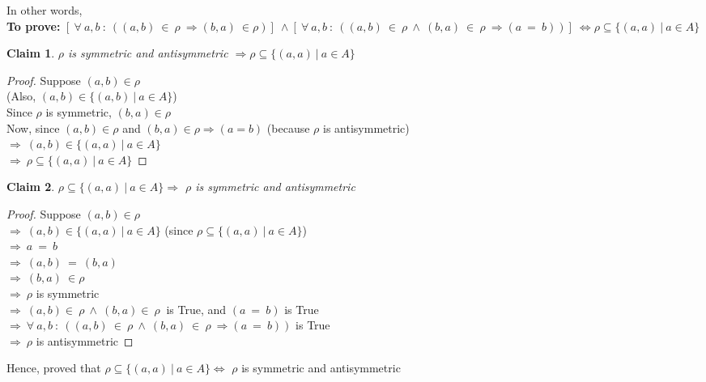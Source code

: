 \documentclass[a4paper]{article}
\newcounter{solution}
\newtheorem{claim}{Claim}[solution]
\begin{document}
\begin{adjustwidth}{0.9cm}{}
In other words,\\
\textbf{To prove:} $[\ \forall\ a,b\ :\ ((a,b)\ \in\ \rho\ \Rightarrow (b,a)\ \in \rho )]\ \wedge [\ \forall\ a,b\ :\ ((a,b)\ \in\ \rho\ \wedge\ (b,a)\ \in\ \rho\ \Rightarrow (a\ =\ b)) ]\ \Leftrightarrow \rho \subseteq \{(a,a)\ |\ a \in A\} $ \\
\begin{claim}
$\rho$ is symmetric and antisymmetric $ \Rightarrow \rho \subseteq \{(a,a)\ |\ a \in A\} $ 
\end{claim} 
\begin{proof}
	Suppose $(a,b) \in \rho $ \\
(Also, $ (a,b) \in \{ (a,b)\ |\ a \in A\}$) \\
Since $\rho $ is symmetric, $(b,a) \in \rho$ \\
Now, since $(a,b) \in \rho$ and $(b,a) \in \rho \Rightarrow (a = b)$ (because $\rho$ is antisymmetric) \\
$\Longrightarrow\ (a,b) \in \{ (a,a)\ |\ a \in A\} $ \\
$\Longrightarrow\ \rho \subseteq \{(a,a)\ |\ a \in A\}$ 
\end{proof}
\begin{claim}
 $\rho \subseteq \{(a,a)\ |\ a \in A\} \Rightarrow$ $\rho$ is symmetric and antisymmetric
\end{claim}
\begin{proof}
	Suppose $(a,b) \in \rho$ \\
$\Longrightarrow\ (a,b) \in \{(a,a)\ |\ a \in A\} $ (since $\rho \subseteq \{(a,a)\ |\ a \in A\}$) \\
$\Longrightarrow\ a\ =\ b$ \\
$\Longrightarrow\ (a,b)\ =\ (b,a)$ \\
$\Longrightarrow\ (b,a)\ \in \rho $ \\
$\Longrightarrow\ \rho$ is symmetric \\
$\Longrightarrow\ (a,b) \in\ \rho\ \wedge\ (b,a) \in\ \rho\ $ is True, and $(a\ =\ b)$ is True \\
$\Longrightarrow\ \forall\ a,b\ :\ ((a,b)\ \in\ \rho\ \wedge\ (b,a)\ \in\ \rho\ \Rightarrow (a\ =\ b))$ is True \\
$\Longrightarrow\ \rho$ is antisymmetric
\end{proof} 
Hence, proved that $\rho \subseteq \{(a,a)\ |\ a \in A\} \Leftrightarrow$ $\rho$ is symmetric and antisymmetric \\\\
\end{adjustwidth}
\end{document}
